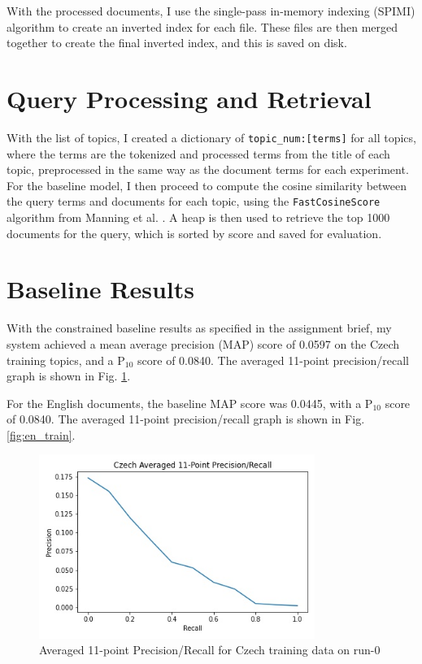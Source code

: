 \documentclass[a4paper]{article}
\begin{document}
With the processed documents, I use the single-pass in-memory indexing (SPIMI)
algorithm to create an inverted index for each file. These files are then merged
together to create the final inverted index, and this is saved on disk.

\section{Query Processing and Retrieval}
With the list of topics, I created a dictionary of \texttt{topic\_num:[terms]}
for all topics, where the terms are the tokenized and processed terms from the
title of each topic, preprocessed in the same way as the document terms for each
experiment. For the baseline model, I then proceed to compute the cosine
similarity between the query terms and documents for each topic, using the
\texttt{FastCosineScore} algorithm from Manning et al. \cite[p.~125]{iir}. A
heap is then used to retrieve the top 1000 documents for the query, which is
sorted by score and saved for evaluation.

\section{Baseline Results}
With the constrained baseline results as specified in the assignment brief, my
system achieved a mean average precision (MAP) score of 0.0597 on the Czech
training topics, and a P$_{10}$ score of 0.0840. The averaged 11-point
precision/recall graph is shown in Fig. \ref{fig:cs_train}.

For the English documents, the baseline MAP score was 0.0445, with a P$_{10}$
score of 0.0840. The averaged 11-point precision/recall graph is shown in Fig.
\ref{fig:en_train}.

\begin{figure}[htpb]
	\centering
	\includegraphics[width=0.8\textwidth]{plot_run-0_cs_precision_recall.jpg}
	\caption{Averaged 11-point Precision/Recall for Czech training data on run-0}
	\label{fig:cs_train}
\end{figure}
\end{document}
